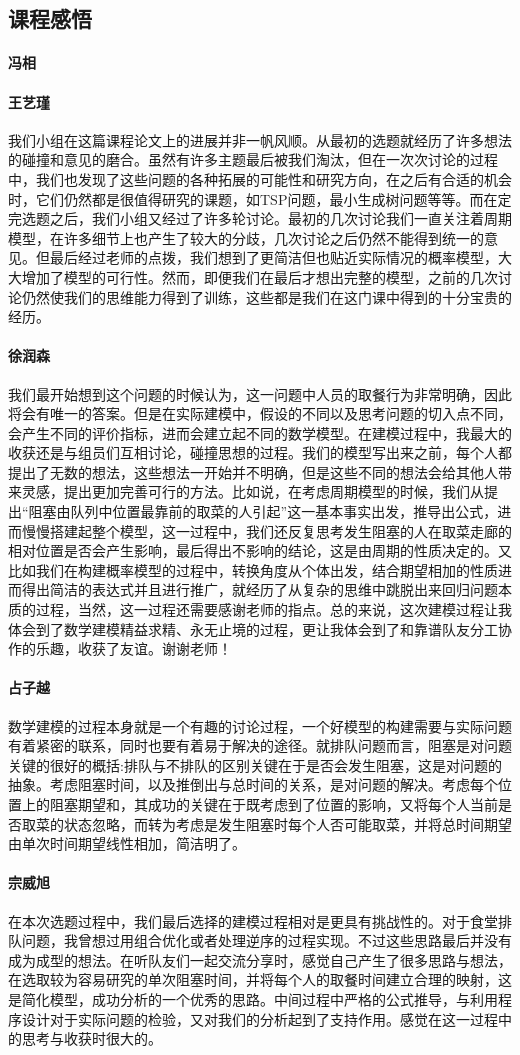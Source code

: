 \documentclass[lang=cn,10pt,a4paper]{elegantpaper}
\begin{document}
\subsection{课程感悟}
\paragraph{冯相}

\paragraph{王艺瑾}
我们小组在这篇课程论文上的进展并非一帆风顺。从最初的选题就经历了许多想法的碰撞和意见的磨合。虽然有许多主题最后被我们淘汰，但在一次次讨论的过程中，我们也发现了这些问题的各种拓展的可能性和研究方向，在之后有合适的机会时，它们仍然都是很值得研究的课题，如TSP问题，最小生成树问题等等。而在定完选题之后，我们小组又经过了许多轮讨论。最初的几次讨论我们一直关注着周期模型，在许多细节上也产生了较大的分歧，几次讨论之后仍然不能得到统一的意见。但最后经过老师的点拨，我们想到了更简洁但也贴近实际情况的概率模型，大大增加了模型的可行性。然而，即便我们在最后才想出完整的模型，之前的几次讨论仍然使我们的思维能力得到了训练，这些都是我们在这门课中得到的十分宝贵的经历。
\paragraph{徐润森}
我们最开始想到这个问题的时候认为，这一问题中人员的取餐行为非常明确，因此将会有唯一的答案。但是在实际建模中，假设的不同以及思考问题的切入点不同，会产生不同的评价指标，进而会建立起不同的数学模型。在建模过程中，我最大的收获还是与组员们互相讨论，碰撞思想的过程。我们的模型写出来之前，每个人都提出了无数的想法，这些想法一开始并不明确，但是这些不同的想法会给其他人带来灵感，提出更加完善可行的方法。比如说，在考虑周期模型的时候，我们从提出“阻塞由队列中位置最靠前的取菜的人引起”这一基本事实出发，推导出公式，进而慢慢搭建起整个模型，这一过程中，我们还反复思考发生阻塞的人在取菜走廊的相对位置是否会产生影响，最后得出不影响的结论，这是由周期的性质决定的。又比如我们在构建概率模型的过程中，转换角度从个体出发，结合期望相加的性质进而得出简洁的表达式并且进行推广，就经历了从复杂的思维中跳脱出来回归问题本质的过程，当然，这一过程还需要感谢老师的指点。总的来说，这次建模过程让我体会到了数学建模精益求精、永无止境的过程，更让我体会到了和靠谱队友分工协作的乐趣，收获了友谊。谢谢老师！
\paragraph{占子越}
数学建模的过程本身就是一个有趣的讨论过程，一个好模型的构建需要与实际问题有着紧密的联系，同时也要有着易于解决的途径。就排队问题而言，阻塞是对问题关键的很好的概括:排队与不排队的区别关键在于是否会发生阻塞，这是对问题的抽象。考虑阻塞时间，以及推倒出与总时间的关系，是对问题的解决。考虑每个位置上的阻塞期望和，其成功的关键在于既考虑到了位置的影响，又将每个人当前是否取菜的状态忽略，而转为考虑是发生阻塞时每个人否可能取菜，并将总时间期望由单次时间期望线性相加，简洁明了。
\paragraph{宗威旭}
在本次选题过程中，我们最后选择的建模过程相对是更具有挑战性的。对于食堂排队问题，我曾想过用组合优化或者处理逆序的过程实现。不过这些思路最后并没有成为成型的想法。在听队友们一起交流分享时，感觉自己产生了很多思路与想法，在选取较为容易研究的单次阻塞时间，并将每个人的取餐时间建立合理的映射，这是简化模型，成功分析的一个优秀的思路。中间过程中严格的公式推导，与利用程序设计对于实际问题的检验，又对我们的分析起到了支持作用。感觉在这一过程中的思考与收获时很大的。
\end{document}
